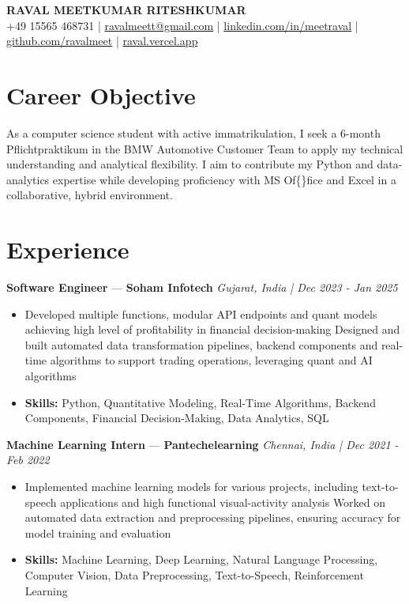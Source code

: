 \documentclass[a4paper,10pt]{article}
\begin{document}
\begin{center}
  {\Large\bfseries RAVAL MEETKUMAR RITESHKUMAR}\\[2pt]
  {\small +49 15565 468731 \;|\; \href{mailto:ravalmeett@gmail.com}{ravalmeett@gmail.com} \;|\; \href{https://www.linkedin.com/in/meetraval/}{linkedin.com/in/meetraval} \;|\; \href{https://github.com/ravalmeet}{github.com/ravalmeet} \;|\; \href{https://raval.vercel.app/}{raval.vercel.app}}
\end{center}
\vspace{-3pt}

\section*{Career Objective}
As a computer science student with active immatrikulation, I seek a 6-month Pflichtpraktikum in the BMW Automotive Customer Team to apply my technical understanding and analytical flexibility. I aim to contribute my Python and data-analytics expertise while developing proficiency with MS Of\{\}fice and Excel in a collaborative, hybrid environment.\par

\section*{Experience}
\textbf{Software Engineer} — \textbf{Soham Infotech} \hfill \textit{Gujarat, India \;|\; Dec 2023 - Jan 2025}\par
\vspace{1pt}
\begin{itemize}
  \item Developed multiple functions, modular API endpoints and quant models achieving high level of profitability in financial decision-making Designed and built automated data transformation pipelines, backend components and real-time algorithms to support trading operations, leveraging quant and AI algorithms
  \item \textbf{Skills:} Python, Quantitative Modeling, Real-Time Algorithms, Backend Components, Financial Decision-Making, Data Analytics, SQL
\end{itemize}
\vspace{3pt}
\textbf{Machine Learning Intern} — \textbf{Pantechelearning} \hfill \textit{Chennai, India \;|\; Dec 2021 - Feb 2022}\par
\vspace{1pt}
\begin{itemize}
  \item Implemented machine learning models for various projects, including text-to-speech applications and high functional visual-activity analysis Worked on automated data extraction and preprocessing pipelines, ensuring accuracy for model training and evaluation
  \item \textbf{Skills:} Machine Learning, Deep Learning, Natural Language Processing, Computer Vision, Data Preprocessing, Text-to-Speech, Reinforcement Learning
\end{itemize}
\end{document}
